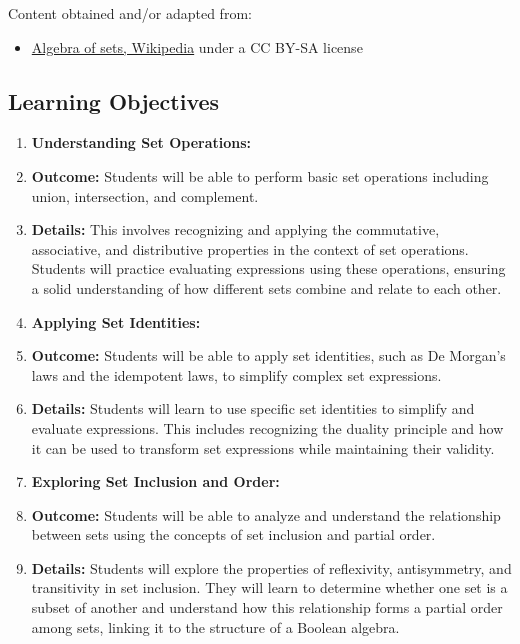 Content obtained and/or adapted from:



\begin{itemize}
    \item \href{https://en.wikipedia.org/wiki/Algebra_of_sets}{Algebra of sets, Wikipedia} under a CC BY-SA license
\end{itemize}


\subsection{Learning Objectives}
\label{ssec:lear-fe6e}


\begin{enumerate}
    \item \textbf{Understanding Set Operations:}
    \item \textbf{Outcome:} Students will be able to perform basic set operations including union, intersection, and complement.
    \item \textbf{Details:} This involves recognizing and applying the commutative, associative, and distributive properties in the context of set operations. Students will practice evaluating expressions using these operations, ensuring a solid understanding of how different sets combine and relate to each other.
    \item \textbf{Applying Set Identities:}
    \item \textbf{Outcome:} Students will be able to apply set identities, such as De Morgan's laws and the idempotent laws, to simplify complex set expressions.
    \item \textbf{Details:} Students will learn to use specific set identities to simplify and evaluate expressions. This includes recognizing the duality principle and how it can be used to transform set expressions while maintaining their validity.
    \item \textbf{Exploring Set Inclusion and Order:}
    \item \textbf{Outcome:} Students will be able to analyze and understand the relationship between sets using the concepts of set inclusion and partial order.
    \item \textbf{Details:} Students will explore the properties of reflexivity, antisymmetry, and transitivity in set inclusion. They will learn to determine whether one set is a subset of another and understand how this relationship forms a partial order among sets, linking it to the structure of a Boolean algebra.
\end{enumerate}


